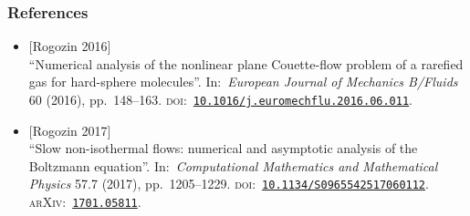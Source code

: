 \documentclass[mathserif]{beamer} %
\begin{document}
\begin{frame}
    \frametitle{References}
    \newcommand\firstdoi{10.1016/j.euromechflu.2016.06.011}
    \newcommand\seconddoi{10.1134/S0965542517060112}
    \newcommand\secondarxiv{1701.05811}
    \begin{itemize}
        \item {[Rogozin 2016]} \\
        “Numerical analysis of the nonlinear plane Couette-flow problem of a rarefied gas for hard-sphere molecules”.
        In:~\textit{European Journal of Mechanics B/Fluids} 60 (2016), pp.~148–163.
        \textsc{doi}:~\href{http://dx.doi.org/\firstdoi}{\alert{\texttt{\firstdoi}}}.
        \item {[Rogozin 2017]} \\
        “Slow non-isothermal flows: numerical and asymptotic analysis of the Boltzmann equation”.
        In:~\textit{Computational Mathematics and Mathematical Physics} 57.7 (2017), pp.~1205–1229.
        \textsc{doi}:~\href{http://dx.doi.org/\seconddoi}{\alert{\texttt{\seconddoi}}}.
        \textsc{arXiv}:~\href{http://arxiv.org/abs/\secondarxiv}{\alert{\texttt{\secondarxiv}}}.
    \end{itemize}
\end{frame}
\end{document}
